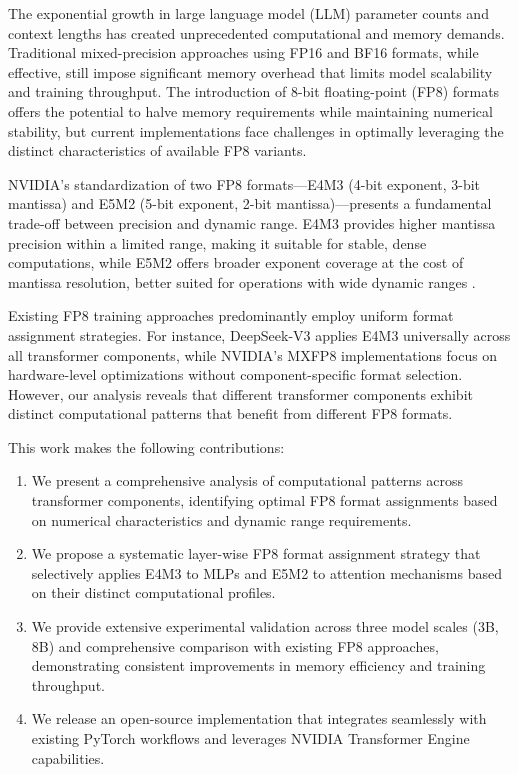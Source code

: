 \documentclass[conference]{IEEEtran}
\begin{document}
The exponential growth in large language model (LLM) parameter counts and context lengths has created unprecedented computational and memory demands. Traditional mixed-precision approaches using FP16 and BF16 formats, while effective, still impose significant memory overhead that limits model scalability and training throughput. The introduction of 8-bit floating-point (FP8) formats \cite{micikevicius2022fp8formatsdeeplearning} offers the potential to halve memory requirements while maintaining numerical stability, but current implementations face challenges in optimally leveraging the distinct characteristics of available FP8 variants.

NVIDIA's standardization of two FP8 formats—E4M3 (4-bit exponent, 3-bit mantissa) and E5M2 (5-bit exponent, 2-bit mantissa)—presents a fundamental trade-off between precision and dynamic range. E4M3 provides higher mantissa precision within a limited range, making it suitable for stable, dense computations, while E5M2 offers broader exponent coverage at the cost of mantissa resolution, better suited for operations with wide dynamic ranges \cite{nvidia2022fp8}.

Existing FP8 training approaches predominantly employ uniform format assignment strategies. For instance, DeepSeek-V3 \cite{deepseekv3} applies E4M3 universally across all transformer components, while NVIDIA's MXFP8 implementations \cite{nvidia2024mxfp8} focus on hardware-level optimizations without component-specific format selection. However, our analysis reveals that different transformer components exhibit distinct computational patterns that benefit from different FP8 formats.

This work makes the following contributions:

\begin{enumerate}
\item We present a comprehensive analysis of computational patterns across transformer components, identifying optimal FP8 format assignments based on numerical characteristics and dynamic range requirements.

\item We propose a systematic layer-wise FP8 format assignment strategy that selectively applies E4M3 to MLPs and E5M2 to attention mechanisms based on their distinct computational profiles.

\item We provide extensive experimental validation across three model scales (3B, 8B) and comprehensive comparison with existing FP8 approaches, demonstrating consistent improvements in memory efficiency and training throughput.

\item We release an open-source implementation that integrates seamlessly with existing PyTorch workflows and leverages NVIDIA Transformer Engine capabilities.
\end{enumerate}
\end{document}
